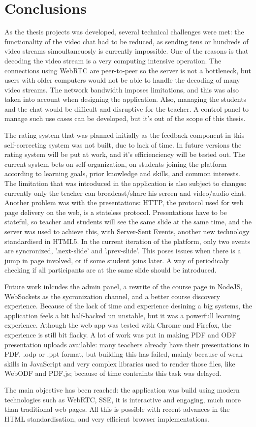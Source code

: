 \section*{Conclusions}
As the thesis projects was developed, several technical challenges were met:
the functionality of the video chat had to be reduced, as sending tens or
hundreds of video streams simoultaneuosly is currently impossible.
One of the reasons is that  decoding the video stream is a very computing
intensive operation. The connections using WebRTC are peer-to-peer so the server
is not a bottleneck, but users with older computers would not be able to handle
the decoding of many video streams. The network bandwidth imposes limitations,
and this was also taken into account when designing the application.
Also, managing the students and the chat would be difficult and disruptive for
the teacher.
A control panel to manage such use cases can be developed, but it's
out of the scope of this thesis.

The rating system that was planned initially as the feedback component in this
self-correcting system was not built, due to lack of time. In future versions
the rating system will be put at work, and it's efficienciency will be tested out.
The current system bets on self-organization, on students joining the platform
according to learning goals, prior knowledge and skills, and common interests.
The limitation that was introduced in the application is also subject to changes:
currently only the teacher can broadcast/share his screen and video/audio chat.
Another problem was with the presentations: HTTP, the protocol used for web page
delivery on the web, is a stateless protocol. Presentations have to be stateful,
so teacher and students will see the same slide at the same time, and the server
was used to achieve this, with Server-Sent Events, another new technology
standardised in HTML5. In the current iteration of the platform, only two events
are syncronized, '.next-slide' and '.prev-slide'. This poses issues when there is
a jump in page involved, or if some student joins later. A way of periodicaly checking
if all participants are at the same slide should be introduced.

Future work inlcudes the admin panel, a rewrite of the course page in NodeJS,
WebSockets as the sycronization channel, and a better course discovery experience.
Because of the lack of time and experience desining a big systems, the application
feels a bit half-backed un unstable, but it was a powerfull learning experience.
Athough the web app was tested with Chrome and Firefox, the experience is still
bit flacky.
A lot of work was put in making PDF and ODF presentation uploads available: many
teachers already have their presentations in PDF, .odp or .ppt format, but building
this has failed, mainly because of weak skills in JavaScript and very complex libraries
used to render those files, like WebODF and PDF.js; because of time contraints this
task was delayed.

The main objective has been reached: the application was build using modern
technologies such as WebRTC, SSE, it is interactive and engaging, much more than
traditional web pages. All this is possible with recent advances in the HTML
standardisation, and very efficient browser implementations.
\clearpage
